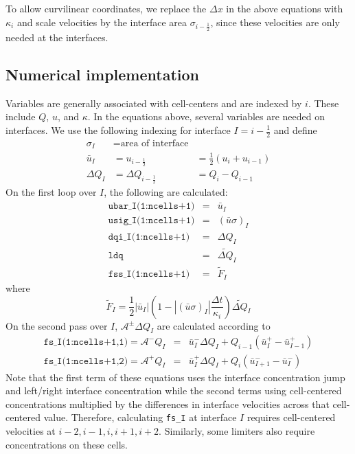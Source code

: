 To allow curvilinear coordinates, we replace the $\Delta x$ in the above equations with $\kappa_i$
and scale velocities by the interface 
area $\sigma_{i-\frac{1}{2}}$, since these velocities are only needed at the interfaces.

\subsection{Numerical implementation}

Variables are generally associated with cell-centers and are indexed by $i$.  These include
$Q$, $u$, and $\kappa$.  In the equations above, several variables are needed on interfaces.
We use the following indexing for interface $I=i-\frac{1}{2}$ and define
\begin{align*}
\sigma_I &= \text{area of interface} &  \\
\bar{u}_I &= u_{i-\frac{1}{2}} &= \frac{1}{2}\left( u_i + u_{i-1} \right)\\
\Delta Q_I &= \Delta Q_{i-\frac{1}{2}} &= Q_i - Q_{i-1} 
\end{align*}
On the first loop over $I$, the following are calculated:
\begin{eqnarray*}
 \texttt{ubar\_I(1:ncells+1)} &=& \bar{u}_I \\
 \texttt{usig\_I(1:ncells+1)} &=& (\bar{u} \sigma)_I \\
 \texttt{dqi\_I(1:ncells+1)} &=& \Delta Q_I \\
 \texttt{ldq} &=& \widetilde{\Delta Q}_I \\
 \texttt{fss\_I(1:ncells+1)} &=& \widetilde{F}_I 
\end{eqnarray*}
where
\begin{equation}
\widetilde{F}_I = \frac{1}{2} \left| \bar{u}_I \right| 
\left( 1 - \left| (\bar{u} \sigma)_I \right| \frac{\Delta t}{\kappa_i}\right)
\widetilde{\Delta Q}_I
\end{equation}
On the second pass over $I$, $\mathcal{A}^{\pm} \Delta Q_I$ are calculated according to
\begin{eqnarray*}
\texttt{fs\_I(1:ncells+1,1)} = \mathcal{A}^{-} Q_I &=& \bar{u}_I^{-} \Delta Q_I  + 
Q_{i-1} (\bar{u}_I^{+} - \bar{u}_{I-1}^{+}) \\
\texttt{fs\_I(1:ncells+1,2)} = \mathcal{A}^{+} Q_I &=& \bar{u}_I^{+} \Delta Q_I  + 
Q_{i} (\bar{u}_{I+1}^{-} - \bar{u}_{I}^{-})
\end{eqnarray*}
Note that the first term of these equations uses the interface concentration
jump and left/right interface concentration while the second terms using cell-centered
concentrations multiplied by the differences in interface velocities across that
cell-centered value.  Therefore, calculating \texttt{fs\_I} at interface $I$ requires
cell-centered velocities at $i-2,i-1,i,i+1,i+2$.  Similarly, some limiters also require
concentrations on these cells.

